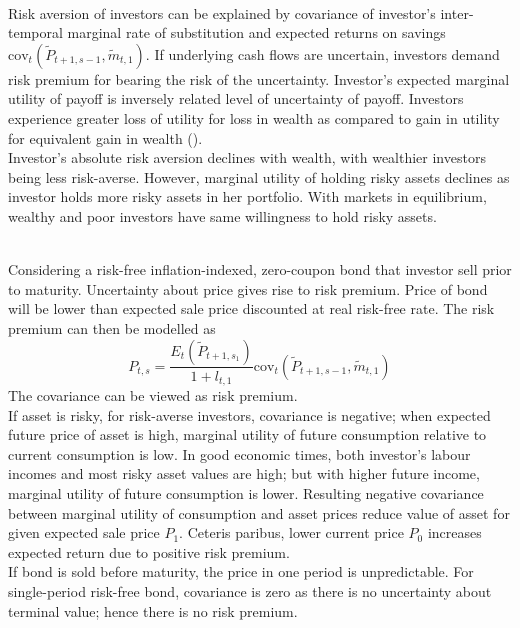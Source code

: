 \begin{remark} \\
Risk aversion of investors can be explained by covariance of investor's inter-temporal marginal rate of substitution and expected returns on savings $\text{cov}_t(\widetilde{P}_{t+1, s-1}, \widetilde{m}_{t,1})$. If underlying cash flows are uncertain, investors demand risk premium for bearing the risk of the uncertainty.  Investor's expected marginal utility of payoff is inversely related level of uncertainty of payoff. Investors experience greater loss of utility for loss in wealth as compared to gain in utility for equivalent gain in wealth ().\\
Investor's absolute risk aversion declines with wealth, with wealthier investors being less risk-averse. However, marginal utility of holding risky assets declines as investor holds more risky assets in her portfolio. With markets in equilibrium, wealthy and poor investors have same willingness to hold risky assets.
\end{remark}

\begin{remark} \\
Considering a risk-free inflation-indexed, zero-coupon bond that investor sell prior to maturity. Uncertainty about price gives rise to risk premium. Price of bond will be lower than expected sale price discounted at real risk-free rate. The risk premium can then be modelled as
\begin{equation}
P_{t,s} = \frac{E_t (\widetilde{P}_{t+1, s_1})}{1 + l_{t, 1}} \text{cov}_t(\widetilde{P}_{t+1, s-1}, \widetilde{m}_{t,1}) \nonumber
\end{equation}
The covariance can be viewed as risk premium.\\
If asset is risky, for risk-averse investors, covariance is negative; when expected future price of asset is high, marginal utility of future consumption relative to current consumption is low. In good economic times, both investor's labour incomes and most risky asset values are high; but with higher future income, marginal utility of future consumption is lower. Resulting negative covariance between marginal utility of consumption and asset prices reduce value of asset for given expected sale price $P_1$. Ceteris paribus, lower current price $P_0$ increases expected return due to positive risk premium.\\
If bond is sold before maturity, the price in one period is unpredictable. For single-period risk-free bond, covariance is zero as there is no uncertainty about terminal value; hence there is no risk premium.
\end{remark}

